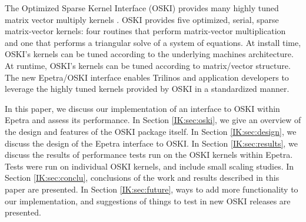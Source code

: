 The Optimized Sparse Kernel Interface (OSKI)
provides many highly tuned matrix vector multiply kernels \cite{IK:OSKI-paper,IK:OSKI-site,IK:OSKI-user}.  OSKI 
provides five optimized, serial, sparse matrix-vector kernels: four routines that perform matrix-vector multiplication and
one that performs a triangular solve of a system of equations.
At install time, OSKI's kernels can be tuned according to the underlying machines architecture.
At runtime, OSKI's kernels can be tuned according to matrix/vector structure.
The new Epetra/OSKI interface
enables Trilinos and application developers to leverage the highly tuned kernels
provided by OSKI in a standardized manner.

In this paper, we discuss our implementation of an interface to OSKI within Epetra and assess its performance.
In Section \ref{IK:sec:oski}, we give an overview of the design and features of the OSKI
package itself.  In Section \ref{IK:sec:design}, we discuss the design of the Epetra interface to OSKI.
In Section \ref{IK:sec:results}, we discuss the results of performance tests
run on the OSKI kernels within Epetra.  Tests were run on individual OSKI kernels, and
include small scaling studies.  In Section \ref{IK:sec:conclu}, conclusions of the work and results
described in this paper are presented.  In Section \ref{IK:sec:future}, ways to add more functionality to our
implementation, and suggestions of things to test in new OSKI releases are presented.
